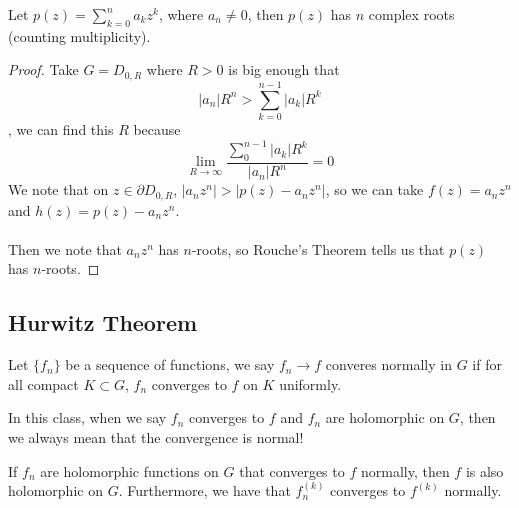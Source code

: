 \begin{corollary}
Let $p(z) = \sum_{k = 0}^n a_k z^k$, where $a_n \neq 0$, then $p(z)$ has $n$ complex roots (counting multiplicity).
\end{corollary}

\begin{proof}
Take $G = D_{0, R}$ where $R > 0$ is big enough that
\[|a_n| R^n > \sum_{k = 0}^{n-1} |a_k| R^k\]
, we can find this $R$ because
\[\lim_{R \to \infty} \frac{\sum_{0}^{n-1} |a_k| R^k}{|a_n| R^n} = 0\]
We note that on $z \in \partial D_{0, R}$, $|a_n z^n| > |p(z) - a_n z^n|$, so we can take $f(z) = a_n z^n$ and $h(z) = p(z) - a_n z^n$.\\\\
Then we note that $a_n z^n$ has $n$-roots, so Rouche's Theorem tells us that $p(z)$ has $n$-roots.
\end{proof}

\subsection{Hurwitz Theorem}

\begin{definition}
Let $\{f_n\}$ be a sequence of functions, we say $f_n \to f$ converes normally in $G$ if for all compact $K \subset G$, $f_n$ converges to $f$ on $K$ uniformly.
\end{definition}

In this class, when we say $f_n$ converges to $f$ and $f_n$ are holomorphic on $G$, then we always mean that the convergence is normal!

\begin{proposition}
If $f_n$ are holomorphic functions on $G$ that converges to $f$ normally, then $f$ is also holomorphic on $G$. Furthermore, we have that $f_n^{(k)}$ converges to $f^{(k)}$ normally.
\end{proposition}


